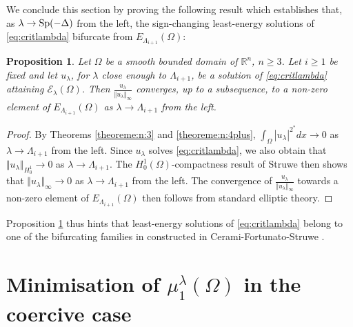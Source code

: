 \documentclass[10pt]{amsart}
\numberwithin{equation}{section}
\newcommand{\R}{\mathbb{R}}
\newcommand{\Sp}{{\rm Sp}}
\newcommand{\Om}{\Omega}
\theoremstyle{plain}
\newtheorem{prop}{Proposition}[section]%
\theoremstyle{remark}
\begin{document}
\medskip


We conclude this section by proving the following result which establishes that, as $\lambda \to \Sp(-\Delta)$ from the left, the sign-changing least-energy solutions of \eqref{eq:critlambda} bifurcate from $E_{\Lambda_{i+1}}(\Om)$: 





\begin{prop} \label{prop:bifurcation}
Let $\Om$ be a smooth bounded domain of $\R^n$, $n \ge 3$. Let $i \ge 1$ be fixed and let $u_\lambda$, for $\lambda$ close enough to $\Lambda_{i+1}$, be a solution of \eqref{eq:critlambda} attaining $\mathcal{E}_{\lambda}(\Om)$. Then $\frac{u_\lambda }{\Vert u_\lambda \Vert_{\infty}}$ converges, up to a subsequence, to a non-zero element of $E_{\Lambda_{i+1}}(\Om)$ as $\lambda \to \Lambda_{i+1}$ from the left. 
\end{prop}


\begin{proof}
By Theorems \ref{theoreme:n:3} and \ref{theoreme:n:4plus}, $\int_{\Om} |u_\lambda|^{2^*}dx \to 0$ as $\lambda \to \Lambda_{i+1}$ from the left. Since $u_\lambda$ solves \eqref{eq:critlambda}, we also obtain that $\Vert u_\lambda \Vert_{H^1_0} \to 0$ as $\lambda \to \Lambda_{i+1}$. The $H^1_0(\Om)$-compactness result of Struwe \cite{Struwe} then shows that $\Vert u_\lambda \Vert_{\infty} \to 0$ as $\lambda \to \Lambda_{i+1}$ from the left. The convergence of  $\frac{u_\lambda }{\Vert u_\lambda \Vert_{\infty}}$ towards a non-zero element of $E_{\Lambda_{i+1}}(\Om)$ then follows from standard elliptic theory.
\end{proof}
Proposition \ref{prop:bifurcation} thus hints that least-energy solutions of \eqref{eq:critlambda} belong to one of the bifurcating families in constructed in  Cerami-Fortunato-Struwe \cite{CeramiFortunatoStruwe}.



\appendix

\section{Minimisation of $\mu_1^{\lambda}(\Om)$ in the coercive case } \label{app:m1}
\end{document}
